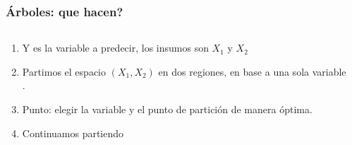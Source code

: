 \documentclass[
  shownotes,
  xcolor={svgnames},
  hyperref={colorlinks,citecolor=DarkBlue,linkcolor=andesred,urlcolor=DarkBlue}
  , aspectratio=169]{beamer}
\begin{document}
\begin{frame}[fragile]
\frametitle{Árboles: que hacen?}


\begin{columns}[T] %
\begin{column}{.48\textwidth}
  
\begin{enumerate}
    \footnotesize
\item Y es la variable a predecir, los insumos son $X_1$ y $X_2$
\medskip
\item  Partimos el espacio $(X_1,X_2)$ en dos regiones, en base a una sola variable .
\medskip
\item Punto: elegir la variable y el punto de partición de manera óptima.
\medskip
\item Continuamos partiendo
\end{enumerate}


\end{column}  
\hfill
\begin{column}{.52\textwidth}

\end{column}
\end{columns}

\end{frame}
\end{document}
